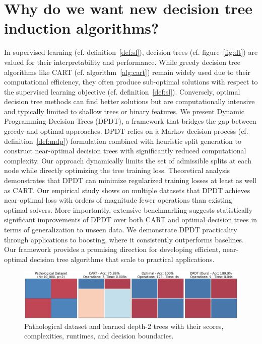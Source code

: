 \section{Why do we want new decision tree induction algorithms?}
In supervised learning (cf. definition~\ref{def:sl}), decision trees (cf. figure~\ref{fig:dt}) are valued for their interpretability and performance. 
While greedy decision tree algorithms like CART (cf. algorithm~\ref{alg:cart}) remain widely used due to their computational efficiency, they often produce sub-optimal solutions with respect to the supervised learning objective (cf. definition~\ref{def:sl}). 
Conversely, optimal decision tree methods can find better solutions but are computationally intensive and typically limited to shallow trees or binary features. We present Dynamic Programming Decision Trees (DPDT), a framework that bridges the gap between greedy and optimal approaches. 
DPDT relies on a Markov decision process (cf. definition~\ref{def:mdp}) formulation combined with heuristic split generation to construct near-optimal decision trees with significantly reduced computational complexity. 
Our approach dynamically limits the set of admissible splits at each node while directly optimizing the tree training loss. Theoretical analysis demonstrates that DPDT can minimize regularized training losses at least as well as CART\@. 
Our empirical study shows on multiple datasets that DPDT achieves near-optimal loss with orders of magnitude fewer operations than existing optimal solvers. 
More importantly, extensive benchmarking suggests statistically significant improvements of DPDT over both CART and optimal decision trees in terms of generalization to unseen data. We demonstrate DPDT practicality through applications to boosting, where it consistently outperforms baselines. 
Our framework provides a promising direction for developing efficient, near-optimal decision tree algorithms that scale to practical applications.

\begin{figure}
    \includegraphics[width=\textwidth]{images/figures/patho_bounds_comparison_checkers.pdf}
    \caption{Pathological dataset and learned depth-2 trees with their scores, complexities, runtimes, and decision boundaries.}
    \label{fig:patho}
\end{figure}

